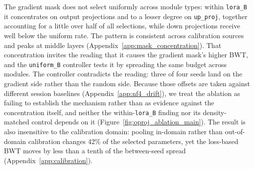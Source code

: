 The gradient mask does not select uniformly across module types: within \texttt{lora\_B} it concentrates on output projections and to a lesser degree on \texttt{up\_proj}, together accounting for a little over half of all selections, while down projections receive well below the uniform rate. The pattern is consistent across calibration sources and peaks at middle layers (Appendix~\ref{app:mask_concentration}). That concentration invites the reading that it causes the gradient mask's higher BWT, and the \texttt{uniform\_B} controller tests it by spreading the same budget across modules. The controller contradicts the reading: three of four seeds land on the gradient side rather than the random side. Because those offsets are taken against different session baselines (Appendix~\ref{app:nf4_drift}), we treat the ablation as failing to establish the mechanism rather than as evidence against the concentration itself, and neither the within-\texttt{lora\_B} finding nor its density-matched control depends on it (Figure~\ref{fig:oproj_ablation_main}). The result is also insensitive to the calibration domain: pooling in-domain rather than out-of-domain calibration changes 42\% of the selected parameters, yet the loss-based BWT moves by less than a tenth of the between-seed spread (Appendix~\ref{app:calibration}).
